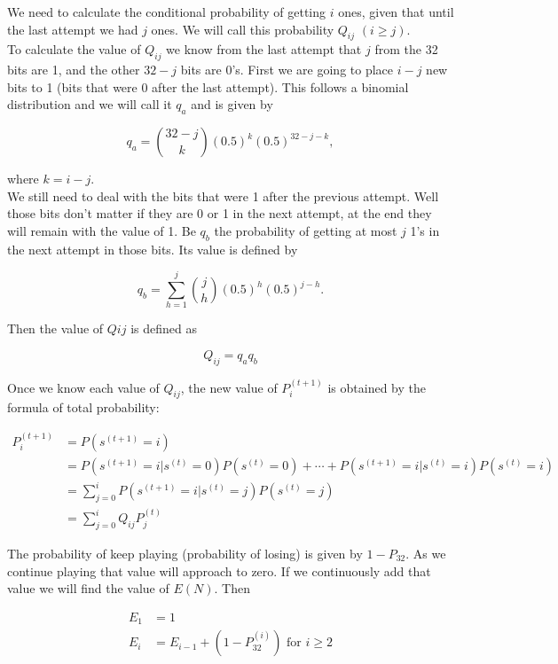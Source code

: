We need to calculate the conditional probability of getting $i$ ones, given that until the last attempt we had $j$ ones. We will call this probability $Q_{ij}$ $(i \geq j)$.\\

To calculate the value of $Q_{ij}$ we know from the last attempt that $j$ from the 32 bits are 1, and the other $32-j$ bits are 0's. First we are going to place $i-j$ new bits to 1 (bits that were 0 after the last attempt). This follows a binomial distribution and we will call it $q_a$ and is given by

$$
q_a = \binom{32-j}{k} (0.5)^k (0.5)^{32-j-k},
$$

where $k = i-j$.\\

We still need to deal with the bits that were 1 after the previous attempt. Well those bits don't matter if they are 0 or 1 in the next attempt, at the end they will remain with the value of 1. Be $q_b$ the probability of getting at most $j$ 1's in the next attempt in those bits. Its value is defined by

$$
q_b = \sum_{h=1}^j \binom{j}{h} (0.5)^h(0.5)^{j-h}.
$$

Then the value of $Q{ij}$ is defined as

$$
Q_{ij} = q_a q_b
$$

Once we know each value of $Q_{ij}$, the new value of $P^{(t+1)}_i$ is obtained by the formula of total probability:
 
\begin{align*}
P^{(t+1)}_i &= P(s^{(t+1)}=i)\\
&= P(s^{(t+1)}=i|s^{(t)}=0)P(s^{(t)}=0) + \cdots + P(s^{(t+1)}=i|s^{(t)}=i)P(s^{(t)}=i)\\
&= \sum_{j=0}^i P(s^{(t+1)}=i|s^{(t)}=j)P(s^{(t)}=j) \\
&= \sum_{j=0}^i Q_{ij} P^{(t)}_j
\end{align*}

The probability of keep playing (probability of losing) is given by $1 - P_{32}$. As we continue playing that value will approach to zero. If we continuously add that value we will find the value of $E(N)$. Then

\begin{align*}
    E_1 &= 1 \\
    E_i &= E_{i-1} + (1 - P_{32}^{(i)}) \mbox{ for } i \geq 2
\end{align*}

